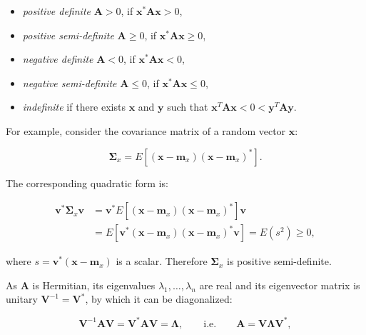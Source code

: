 \documentclass[10pt,b5paper,titlepage]{book}
\begin{document}
\begin{itemize}
    \item \textit{positive definite} $\mathbf{A} > 0$, if $\mathbf{x}^{*}\mathbf{A}\mathbf{x} > 0$,
    \item \textit{positive semi-definite} $\mathbf{A} \ge 0$, if $\mathbf{x}^{*}\mathbf{A}\mathbf{x} \ge 0$,
    \item \textit{negative definite} $\mathbf{A} < 0$, if $\mathbf{x}^{*}\mathbf{A}\mathbf{x} < 0$,
    \item \textit{negative semi-definite} $\mathbf{A} \le 0$, if $\mathbf{x}^{*}\mathbf{A}\mathbf{x} \le 0$,
    \item \textit{indefinite} if there exists $\mathbf{x}$ and $\mathbf{y}$ such
        that $\mathbf{x}^{T}\mathbf{A}\mathbf{x} < 0 < \mathbf{y}^{T}\mathbf{A}\mathbf{y}$.
\end{itemize}

For example, consider the covariance matrix of a random vector $\mathbf{x}$:

\begin{equation}
    \mathbf{\Sigma}_{x} = E [(\mathbf{x}-\mathbf{m}_{x})(\mathbf{x}-\mathbf{m}_{x})^{*}]
.\end{equation}

The corresponding quadratic form is:

\begin{equation}
    \begin{array}{ll}
         \mathbf{v}^{*}\mathbf{\Sigma}_{x}\mathbf{v}
         &= \mathbf{v}^{*} E[(\mathbf{x}-\mathbf{m}_{x})(\mathbf{x}-\mathbf{m}_{x})^{*}] \mathbf{v}\\
         &= E[\mathbf{v}^{*}(\mathbf{x}-\mathbf{m}_{x})(\mathbf{x}-\mathbf{m}_{x})^{*}\mathbf{v}]
         = E(s^{2}) \ge 0,
    \end{array}
\end{equation}

where $s = \mathbf{v}^{*}(\mathbf{x}-\mathbf{m}_{x})$ is a scalar.
Therefore $\mathbf{\Sigma}_{x}$ is positive semi-definite.

As $\mathbf{A}$ is Hermitian, its eigenvalues $\lambda_{1}, \ldots, \lambda_{n}$
are real and its eigenvector matrix is unitary $\mathbf{V}^{-1} = \mathbf{V}^{*}$,
by which it can be diagonalized:

\begin{equation}
    \mathbf{V}^{-1}\mathbf{A}\mathbf{V}
    = \mathbf{V}^{*}\mathbf{A}\mathbf{V} = \mathbf{\Lambda}
    , \qquad \text{i.e.} \qquad
    \mathbf{A} = \mathbf{V}\mathbf{\Lambda}\mathbf{V}^{*}
,\end{equation}
\end{document}
